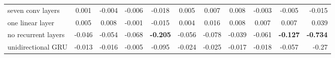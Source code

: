 \begin{tabular}{lcccccccccr}
seven conv layers   & 0.001          & -0.004         & -0.006          & -0.018          & 0.005           & 0.007           & 0.008           & -0.003          & -0.005          & -0.015               \\
one linear layer    & 0.005          & 0.008          & -0.001          & -0.015          & 0.004           & 0.016           & 0.008           & 0.007           & 0.007           & 0.039                \\
no recurrent layers & -0.046         & -0.054         & -0.068          & \textbf{-0.205} & -0.056          & -0.078          & -0.039          & -0.061          & \textbf{-0.127} & \textbf{-0.734}      \\
unidirectional GRU  & -0.013         & -0.016         & -0.005          & -0.095          & -0.024          & -0.025          & -0.017          & -0.018          & -0.057          & -0.27               
\end{tabular}
